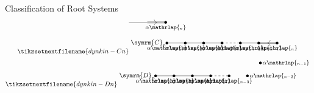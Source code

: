 \documentclass[fleqn]{NotesClass}
\newcommand{\dynkin}[2]{\symrm{#1}_{#2}}
\begin{document}
\begin{thm}{Classification of Root Systems}{}
\begin{gather}
\begin{tikzpicture}[font=\small]
                \fill (6, 0) circle [radius=0.075cm] node [below] {\(\alpha\mathrlap{_n}\)};
                \draw (4, 0) -- (5, 0);
                \draw (5, 0.03) -- ++ (1, 0); 
                \draw (5, -0.03) -- ++ (1, 0);
                \draw [-{>[length=1.5mm,width=3mm]}, xshift=5.52cm] (0, 0) -- ++ (0.001, 0);
            \end{tikzpicture}
            \\
            \tikzsetnextfilename{dynkin-Cn}
            \begin{tikzpicture}[font=\small]
                \node at (-1, 0) {\normalsize\(\dynkin{C}{n}\)};
                \fill (0, 0) circle [radius=0.075cm] node [below] {\(\alpha\mathrlap{_1}\)};
                \fill (1, 0) circle [radius=0.075cm] node [below] {\(\alpha\mathrlap{_2}\)};
                \fill (2, 0) circle [radius=0.075cm] node [below] {\(\alpha\mathrlap{_3}\)};
                \fill (3, 0) circle [radius=0.075cm] node [below] {\(\alpha\mathrlap{_4}\)};
                \draw (0, 0) -- (3, 0);
                \draw [dashed] (3, 0) -- ++ (1, 0);
                \fill (4, 0) circle [radius=0.075cm] node [below] {\(\alpha\mathrlap{_{n-2}}\)};
                \fill (5, 0) circle [radius=0.075cm] node [below] {\(\alpha\mathrlap{_{n-1}}\)};
                \fill (6, 0) circle [radius=0.075cm] node [below] {\(\alpha\mathrlap{_n}\)};
                \draw (4, 0) -- (5, 0);
                \draw (5, 0.03) -- ++ (1, 0); 
                \draw (5, -0.03) -- ++ (1, 0);
                \draw [-{>[length=1.5mm,width=3mm]}, xshift=5.48cm] (0, 0) -- ++ (-0.001, 0);
            \end{tikzpicture}
            \\
            \tikzsetnextfilename{dynkin-Dn}
            \begin{tikzpicture}[font=\small]
                \node at (-1, 0) {\normalsize\(\dynkin{D}{n}\)};
                \fill (0, 0) circle [radius=0.075cm] node [below] {\(\alpha\mathrlap{_1}\)};
                \fill (1, 0) circle [radius=0.075cm] node [below] {\(\alpha\mathrlap{_2}\)};
                \fill (2, 0) circle [radius=0.075cm] node [below] {\(\alpha\mathrlap{_3}\)};
                \fill (3, 0) circle [radius=0.075cm] node [below] {\(\alpha\mathrlap{_4}\)};
                \draw (0, 0) -- (3, 0);
                \draw [dashed] (3, 0) -- ++ (1, 0);
                \fill (4, 0) circle [radius=0.075cm] node [below] {\(\alpha\mathrlap{_{n-3}}\)};
                \fill (5, 0) circle [radius=0.075cm] node [right] {\(\alpha\mathrlap{_{n-2}}\)};
                \fill[xshift=5cm, shift={(45:1)}] coordinate (A) circle [radius=0.075cm] node [right] {\(\alpha\mathrlap{_{n-1}}\)};

\end{tikzpicture}
\end{gather}
\end{thm}
\end{document}
